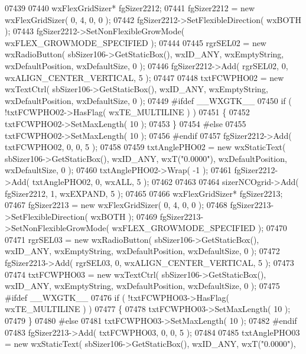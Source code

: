 \begin{DoxyCode}
07439     
07440     wxFlexGridSizer* fgSizer2212;
07441     fgSizer2212 = \textcolor{keyword}{new} wxFlexGridSizer( 0, 4, 0, 0 );
07442     fgSizer2212->SetFlexibleDirection( wxBOTH );
07443     fgSizer2212->SetNonFlexibleGrowMode( wxFLEX\_GROWMODE\_SPECIFIED );
07444     
07445     rgrSEL02 = \textcolor{keyword}{new} wxRadioButton( sbSizer106->GetStaticBox(), wxID\_ANY, wxEmptyString, wxDefaultPosition, 
      wxDefaultSize, 0 );
07446     fgSizer2212->Add( rgrSEL02, 0, wxALIGN\_CENTER\_VERTICAL, 5 );
07447     
07448     txtFCWPHO02 = \textcolor{keyword}{new} wxTextCtrl( sbSizer106->GetStaticBox(), wxID\_ANY, wxEmptyString, wxDefaultPosition, 
      wxDefaultSize, 0 );
07449 \textcolor{preprocessor}{    #ifdef \_\_WXGTK\_\_}
07450     \textcolor{keywordflow}{if} ( !txtFCWPHO02->HasFlag( wxTE\_MULTILINE ) )
07451     \{
07452     txtFCWPHO02->SetMaxLength( 10 );
07453     \}
07454 \textcolor{preprocessor}{    #else}
07455     txtFCWPHO02->SetMaxLength( 10 );
07456 \textcolor{preprocessor}{    #endif}
07457     fgSizer2212->Add( txtFCWPHO02, 0, 0, 5 );
07458     
07459     txtAnglePHO02 = \textcolor{keyword}{new} wxStaticText( sbSizer106->GetStaticBox(), wxID\_ANY, wxT(\textcolor{stringliteral}{"0.0000"}), 
      wxDefaultPosition, wxDefaultSize, 0 );
07460     txtAnglePHO02->Wrap( -1 );
07461     fgSizer2212->Add( txtAnglePHO02, 0, wxALL, 5 );
07462     
07463     
07464     sizerNCOgrid->Add( fgSizer2212, 1, wxEXPAND, 5 );
07465     
07466     wxFlexGridSizer* fgSizer2213;
07467     fgSizer2213 = \textcolor{keyword}{new} wxFlexGridSizer( 0, 4, 0, 0 );
07468     fgSizer2213->SetFlexibleDirection( wxBOTH );
07469     fgSizer2213->SetNonFlexibleGrowMode( wxFLEX\_GROWMODE\_SPECIFIED );
07470     
07471     rgrSEL03 = \textcolor{keyword}{new} wxRadioButton( sbSizer106->GetStaticBox(), wxID\_ANY, wxEmptyString, wxDefaultPosition, 
      wxDefaultSize, 0 );
07472     fgSizer2213->Add( rgrSEL03, 0, wxALIGN\_CENTER\_VERTICAL, 5 );
07473     
07474     txtFCWPHO03 = \textcolor{keyword}{new} wxTextCtrl( sbSizer106->GetStaticBox(), wxID\_ANY, wxEmptyString, wxDefaultPosition, 
      wxDefaultSize, 0 );
07475 \textcolor{preprocessor}{    #ifdef \_\_WXGTK\_\_}
07476     \textcolor{keywordflow}{if} ( !txtFCWPHO03->HasFlag( wxTE\_MULTILINE ) )
07477     \{
07478     txtFCWPHO03->SetMaxLength( 10 );
07479     \}
07480 \textcolor{preprocessor}{    #else}
07481     txtFCWPHO03->SetMaxLength( 10 );
07482 \textcolor{preprocessor}{    #endif}
07483     fgSizer2213->Add( txtFCWPHO03, 0, 0, 5 );
07484     
07485     txtAnglePHO03 = \textcolor{keyword}{new} wxStaticText( sbSizer106->GetStaticBox(), wxID\_ANY, wxT(\textcolor{stringliteral}{"0.0000"}), 

\end{DoxyCode}
